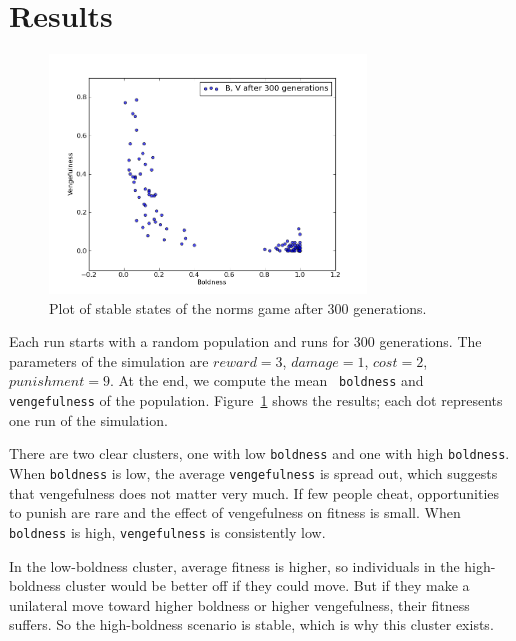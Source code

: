 \documentclass[10pt]{book}
\begin{document}
\section{Results}

\begin{figure}
  \begin{center}
    \includegraphics[width=0.75\textwidth]{figs/replicateNorms_stableBV_03.png}
  \end{center}
  \caption{Plot of stable states of the norms game after 300 generations.}\label{fig.normsRep}
\end{figure}

Each run starts with a random population and runs for 300 generations.
The parameters of the simulation are $reward = 3$, $damage = 1$, $cost
= 2$, $punishment = 9$.  At the end, we compute the mean {\tt
  boldness} and {\tt vengefulness} of the population.
Figure~\ref{fig.normsRep} shows the results; each dot represents one
run of the simulation.

There are two clear clusters, one with low \texttt{boldness} and one
with high \texttt{boldness}.  When \texttt{boldness} is low, the
average \texttt{vengefulness} is spread out, which suggests that
vengefulness does not matter very much.  If few people cheat,
opportunities to punish are rare and the effect of vengefulness on
fitness is small.  When \texttt{boldness} is high,
\texttt{vengefulness} is consistently low.

In the low-boldness cluster, average fitness is higher, so
individuals in the high-boldness cluster would be better off if they
could move.  But if they make a unilateral move toward higher
boldness or higher vengefulness, their fitness suffers.  So the
high-boldness scenario is stable, which is why this cluster exists.

\end{document}
